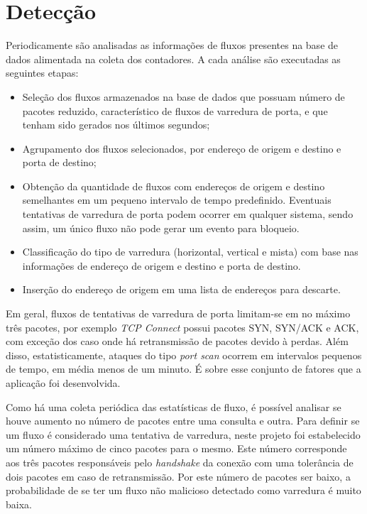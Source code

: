 \section{Detecção}
\label{sec:deteccao}

Periodicamente são analisadas as informações de fluxos presentes na base de dados alimentada na coleta dos contadores. A cada análise são executadas as seguintes etapas:

\begin{itemize}
    \item Seleção dos fluxos armazenados na base de dados que possuam número de pacotes reduzido, característico de fluxos de varredura de porta, e que tenham sido gerados nos últimos segundos;
    \item Agrupamento dos fluxos selecionados, por endereço de origem e destino e porta de destino;
    \item Obtenção da quantidade de fluxos com endereços de origem e destino semelhantes em um pequeno intervalo de tempo predefinido. Eventuais tentativas de varredura de porta podem ocorrer em qualquer sistema, sendo assim, um único fluxo não pode gerar um evento para bloqueio.
    \item Classificação do tipo de varredura (horizontal, vertical e mista) com base nas informações de endereço de origem e destino e porta de destino.
    \item Inserção do endereço de origem em uma lista de endereços para descarte.
\end{itemize}

Em geral, fluxos de tentativas de varredura de porta limitam-se em no máximo três pacotes, por exemplo \textit{TCP Connect} possui pacotes SYN, SYN/ACK e ACK, com exceção dos caso onde há retransmissão de pacotes devido à perdas. Além disso, estatisticamente, ataques do tipo \textit{port scan} ocorrem em intervalos pequenos de tempo, em média menos de um minuto. É sobre esse conjunto de fatores que a aplicação foi desenvolvida.

Como há uma coleta periódica das estatísticas de fluxo, é possível analisar se houve aumento no número de pacotes entre uma consulta e outra. Para definir se um fluxo é considerado uma tentativa de varredura, neste projeto foi estabelecido um número máximo de cinco pacotes para o mesmo. Este número corresponde aos três pacotes responsáveis pelo \textit{handshake} da conexão com uma tolerância de dois pacotes em caso de retransmissão. Por este número de pacotes ser baixo, a probabilidade de se ter um fluxo não malicioso detectado como varredura é muito baixa. 

